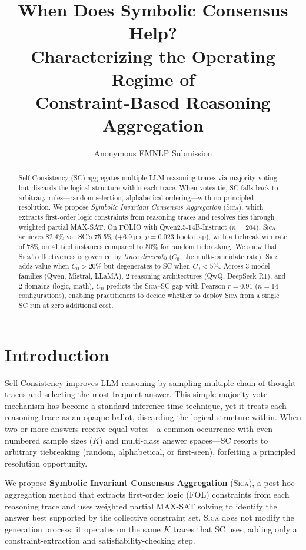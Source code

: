 \documentclass[11pt,a4paper]{article}
\title{When Does Symbolic Consensus Help?\\Characterizing the Operating Regime of\\Constraint-Based Reasoning Aggregation}
\author{
  Anonymous EMNLP Submission
}
\date{}
\newcommand{\sica}{\textsc{Sica}}
\newcommand{\czero}{C_0}
\begin{document}
\maketitle

\begin{abstract}
Self-Consistency (SC) aggregates multiple LLM reasoning traces via majority voting but discards the logical structure within each trace.
When votes tie, SC falls back to arbitrary rules---random selection, alphabetical ordering---with no principled resolution.
We propose \emph{Symbolic Invariant Consensus Aggregation} (\sica{}), which extracts first-order logic constraints from reasoning traces and resolves ties through weighted partial MAX-SAT.
On FOLIO with Qwen2.5-14B-Instruct ($n{=}204$), \sica{} achieves 82.4\% vs.\ SC's 75.5\% (+6.9\,pp, $p{=}0.023$ bootstrap), with a tiebreak win rate of 78\% on 41 tied instances compared to 50\% for random tiebreaking.
We show that \sica{}'s effectiveness is governed by \emph{trace diversity} ($\czero{}$, the multi-candidate rate): \sica{} adds value when $\czero{}>20\%$ but degenerates to SC when $\czero{}<5\%$.
Across 3 model families (Qwen, Mistral, LLaMA), 2 reasoning architectures (QwQ, DeepSeek-R1), and 2 domains (logic, math), $\czero{}$ predicts the \sica{}--SC gap with Pearson $r{=}0.91$ ($n{=}14$ configurations), enabling practitioners to decide whether to deploy \sica{} from a single SC run at zero additional cost.
\end{abstract}


\section{Introduction}
\label{sec:intro}

Self-Consistency \cite{wang2023selfconsistency} improves LLM reasoning by sampling multiple chain-of-thought traces and selecting the most frequent answer.
This simple majority-vote mechanism has become a standard inference-time technique, yet it treats each reasoning trace as an opaque ballot, discarding the logical structure within.
When two or more answers receive equal votes---a common occurrence with even-numbered sample sizes ($K$) and multi-class answer spaces---SC resorts to arbitrary tiebreaking (random, alphabetical, or first-seen), forfeiting a principled resolution opportunity.

We propose \textbf{Symbolic Invariant Consensus Aggregation} (\sica{}), a post-hoc aggregation method that extracts first-order logic (FOL) constraints from each reasoning trace and uses weighted partial MAX-SAT solving to identify the answer best supported by the collective constraint set.
\sica{} does not modify the generation process: it operates on the same $K$ traces that SC uses, adding only a constraint-extraction and satisfiability-checking step.
\end{document}
